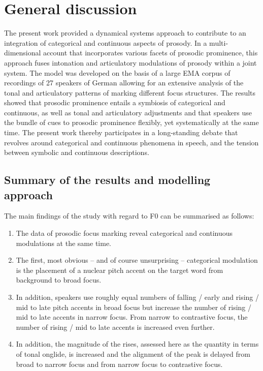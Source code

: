 \chapter{General discussion}
\label{chapter_discussion}

The present work provided a dynamical systems approach to contribute to an integration of categorical and continuous aspects of prosody. In a multi-dimensional account that incorporates various facets of prosodic prominence, this approach fuses intonation and articulatory modulations of prosody within a joint system. The model was developed on the basis of a large EMA corpus of recordings of 27 speakers of German allowing for an extensive analysis of the tonal and articulatory patterns of marking different focus structures. The results showed that prosodic prominence entails a symbiosis of categorical and continuous, as well as tonal and articulatory adjustments and that speakers use the bundle of cues to prosodic prominence flexibly, yet systematically at the same time. The present work thereby participates in a long-standing debate that revolves around categorical and continuous phenomena in speech, and the tension between symbolic and continuous descriptions.

\section{Summary of the results and modelling approach}

The main findings of the study with regard to F0 can be summarised as follows:

\begin{enumerate}

\item The data of prosodic focus marking reveal categorical and continuous modulations at the same time.

\item The first, most obvious – and of course unsurprising – categorical modulation is the placement of a nuclear pitch accent on the target word from background to broad focus.

\item In addition, speakers use roughly equal numbers of falling / early and rising / mid to late pitch accents in broad focus but increase the number of rising / mid to late accents in narrow focus. From narrow to contrastive focus, the number of rising / mid to late accents is increased even further.

\item In addition, the magnitude of the rises, assessed here as the quantity in terms of tonal onglide, is increased and the alignment of the peak is delayed from broad to narrow focus and from narrow focus to contrastive focus.

\end{enumerate}

